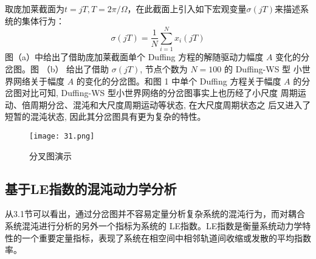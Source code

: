 取庞加莱截面为$t=j T, T=2 \pi / \Omega$，在此截面上引入如下宏观变量$\sigma(j T)$来描述系统的集体行为：
\begin{equation}
    \sigma(j T)=\frac{1}{N} \sum_{i=1}^N x_i(j T)
\end{equation}
图（a）中给出了借助庞加莱截面单个 Duffing 方程的解随驱动力幅度 $A$ 变化的分岔图。图 （b） 给出了借助 $\sigma(j T)$, 
节点个数为 $N=100$ 的 Duffing-WS 型 小世界网络关于幅度 $A$ 的变化的分岔图。和图 1 中单个 Duffing 方程关于幅度 $A$ 
的分岔图对比可知, Duffing-WS 型小世界网络的分岔图事实上也历经了小尺度 周期运动、倍周期分岔、混沌和大尺度周期运动等状态,
 在大尺度周期状态之 后又进入了短暂的混沌状态, 因此其分岔图具有更为复杂的特性。
 \begin{figure}[!htbp]
    \centering
    \texttt{[image: 31.png]}
    \caption{分叉图演示}
 \end{figure}
\subsection{基于LE指数的混沌动力学分析}
从3.1节可以看出，通过分岔图并不容易定量分析复杂系统的混沌行为，而对耦合系统混沌进行分析的另外一个指标为系统的
LE指数。LE指数是衡量系统动力学特性的一个重要定量指标，表现了系统在相空间中相邻轨道间收缩或发散的平均指数率。

